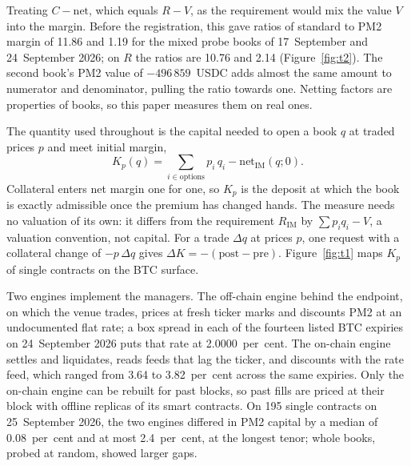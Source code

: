 \documentclass[a4paper,fleqn]{cas-dc}
\begin{document}
Treating ${C - \mathrm{net}}$, which equals ${R - V}$, as the requirement would mix the value $V$ into the
margin. Before the registration, this gave ratios of standard to PM2 margin of 11.86 and 1.19 for the mixed probe books
of 17~September and 24~September 2026; on $R$ the ratios are 10.76 and 2.14 (Figure~\ref{fig:t2}). The second book's PM2 value of
$-496\,859$~USDC adds almost the same amount to numerator and denominator, pulling the ratio towards one. Netting
factors are properties of books, so this paper measures them on real ones.

The quantity used throughout is the capital needed to open a book $q$ at traded prices $p$ and meet initial
margin,
\begin{equation}
  K_p(q) = \sum_{i \in \text{options}} p_i\,q_i - \mathrm{net}_{\mathrm{IM}}(q;0).
\end{equation}
Collateral enters net margin one for one, so $K_p$ is the deposit at which the book is exactly admissible
once the premium has changed hands. The measure needs no valuation of its own: it differs from the
requirement $R_{\mathrm{IM}}$ by ${\sum p_i q_i - V}$, a valuation convention, not capital. For a trade
$\Delta q$ at prices $p$, one request with a collateral change of $-p\,\Delta q$ gives
${\Delta K = -(\mathrm{post} - \mathrm{pre})}$. Figure~\ref{fig:t1} maps $K_p$ of single contracts on the BTC
surface.

Two engines implement the managers. The off-chain engine behind the endpoint, on which the venue trades, prices at
fresh ticker marks and discounts PM2 at an undocumented flat rate; a box spread in each of the fourteen listed BTC
expiries on 24~September 2026 puts that rate at 2.0000~per~cent. The on-chain engine settles and liquidates, reads
feeds that lag the ticker, and discounts with the rate feed, which ranged from 3.64 to 3.82~per~cent across the
same expiries. Only the on-chain engine can be rebuilt for past blocks, so past fills are priced at their block with
offline replicas of its smart contracts. On 195 single contracts on 25~September 2026, the two
engines differed in PM2 capital by a median of 0.08~per~cent and at most 2.4~per~cent, at the longest tenor; whole
books, probed at random, showed larger gaps.
\end{document}
